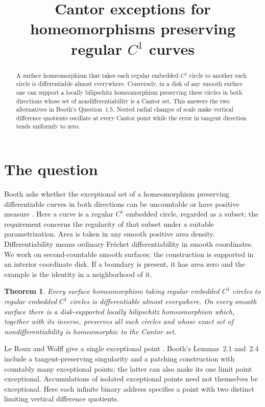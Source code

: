 \documentclass[11pt,a4paper]{amsart}
\title[Cantor exceptions for curve-preserving homeomorphisms]{Cantor exceptions for homeomorphisms preserving regular \(C^1\) curves}
\date{}
\newtheorem{theorem}{Theorem}
\begin{document}
\begin{abstract}
A surface homeomorphism that takes each regular embedded \(C^1\) circle to another such circle is differentiable almost everywhere.
Conversely, in a disk of any smooth surface one can support a locally bilipschitz homeomorphism preserving these circles in both directions whose set of nondifferentiability is a Cantor set.
This answers the two alternatives in Booth's Question~1.5.
Nested radial changes of scale make vertical difference quotients oscillate at every Cantor point while the error in tangent direction tends uniformly to zero.
\end{abstract}
\maketitle
\section{The question}
Booth asks whether the exceptional set of a homeomorphism preserving differentiable curves in both directions can be uncountable or have positive measure \cite[Question~1.5]{booth}. Here a curve is a regular \(C^1\) embedded circle, regarded as a subset; the requirement concerns the regularity of that subset under a suitable parametrization. Area is taken in any smooth positive area density. Differentiability means ordinary Fr\'echet differentiability in smooth coordinates. We work on second-countable smooth surfaces; the construction is supported in an interior coordinate disk. If a boundary is present, it has area zero and the example is the identity in a neighborhood of it.
\begin{theorem}\label{main}
Every surface homeomorphism taking regular embedded \(C^1\) circles to regular embedded \(C^1\) circles is differentiable almost everywhere. On every smooth surface there is a disk-supported locally bilipschitz homeomorphism which, together with its inverse, preserves all such circles and whose exact set of nondifferentiability is homeomorphic to the Cantor set.
\end{theorem}
Le Roux and Wolff give a single exceptional point \cite[Section~5]{lerouxwolff}. Booth's Lemmas~2.1 and~2.4 include a tangent-preserving singularity and a patching construction with countably many exceptional points; the latter can also make its one limit point exceptional. Accumulations of isolated exceptional points need not themselves be exceptional. Here each infinite binary address specifies a point with two distinct limiting vertical difference quotients.
\end{document}
